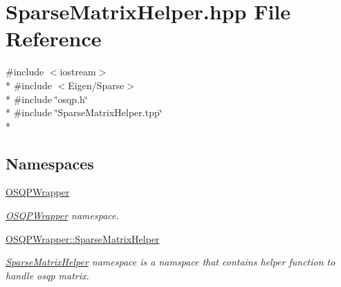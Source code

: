 \section{Sparse\+Matrix\+Helper.\+hpp File Reference}
\label{SparseMatrixHelper_8hpp}
{\ttfamily \#include $<$iostream$>$}\\*
{\ttfamily \#include $<$Eigen/\+Sparse$>$}\\*
{\ttfamily \#include \char`\"{}osqp.\+h\char`\"{}}\\*
{\ttfamily \#include \char`\"{}Sparse\+Matrix\+Helper.\+tpp\char`\"{}}\\*
\subsection*{Namespaces}
\begin{DoxyCompactItemize}
\item 
 \hyperlink{namespaceOSQPWrapper}{O\+S\+Q\+P\+Wrapper}
\begin{DoxyCompactList}\small\item\em \hyperlink{namespaceOSQPWrapper}{O\+S\+Q\+P\+Wrapper} namespace. \end{DoxyCompactList}\item 
 \hyperlink{namespaceOSQPWrapper_1_1SparseMatrixHelper}{O\+S\+Q\+P\+Wrapper\+::\+Sparse\+Matrix\+Helper}
\begin{DoxyCompactList}\small\item\em \hyperlink{namespaceOSQPWrapper_1_1SparseMatrixHelper}{Sparse\+Matrix\+Helper} namespace is a namspace that contains helper function to handle osqp matrix. \end{DoxyCompactList}\end{DoxyCompactItemize}

